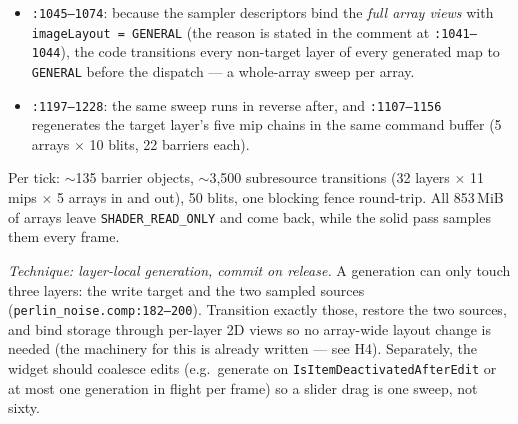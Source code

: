 \documentclass[11pt,a4paper]{article}
\begin{document}
\begin{itemize}[leftmargin=1.4em,itemsep=2pt]
\item \texttt{:1045--1074}: because the sampler descriptors bind the
\emph{full array views} with \texttt{imageLayout = GENERAL} (the reason is
stated in the comment at \texttt{:1041--1044}), the code transitions every
non-target layer of every generated map to \texttt{GENERAL} before the
dispatch --- a whole-array sweep per array.
\item \texttt{:1197--1228}: the same sweep runs in reverse after, and
\texttt{:1107--1156} regenerates the target layer's five mip chains in the
same command buffer (5 arrays $\times$ 10 blits, 22 barriers each).
\end{itemize}

Per tick: $\sim$135 barrier objects, $\sim$3{,}500 subresource transitions
(32 layers $\times$ 11 mips $\times$ 5 arrays in and out), 50 blits, one
blocking fence round-trip. All 853\,MiB of arrays leave
\texttt{SHADER\_READ\_ONLY} and come back, while the solid pass samples them
every frame.

\textit{Technique: layer-local generation, commit on release.} A generation can
only touch three layers: the write target and the two sampled sources
(\texttt{perlin\_noise.comp:182--200}). Transition exactly those, restore the
two sources, and bind storage through per-layer 2D views so no array-wide
layout change is needed (the machinery for this is already written --- see H4).
Separately, the widget should coalesce edits (e.g.\ generate on
\texttt{IsItemDeactivatedAfterEdit} or at most one generation in flight per
frame) so a slider drag is one sweep, not sixty.
\end{document}
